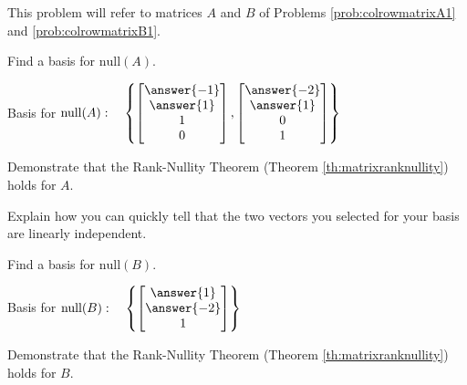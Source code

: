 \documentclass{ximera}
\begin{document}
\begin{problem}
This problem will refer to matrices $A$ and $B$ of Problems \ref{prob:colrowmatrixA1} and \ref{prob:colrowmatrixB1}.

\begin{problem}\label{prob:nullABC1}
Find a basis for $\mbox{null}(A)$.

Basis for $\mbox{null}(A):\quad \left\{ \begin{bmatrix}\answer{-1}\\\answer{1}\\1\\0\end{bmatrix}, \begin{bmatrix}\answer{-2}\\\answer{1}\\0\\1\end{bmatrix}\right\}$

Demonstrate that the Rank-Nullity Theorem (Theorem \ref{th:matrixranknullity}) holds for $A$.

Explain how you can quickly tell that the two vectors you selected for your basis are linearly independent.
\end{problem}

\begin{problem}\label{prob:nullABC2}
Find a basis for $\mbox{null}(B)$.

Basis for $\mbox{null}(B):\quad \left\{ \begin{bmatrix}\answer{1}\\\answer{-2}\\1\end{bmatrix}\right\}$

Demonstrate that the Rank-Nullity Theorem (Theorem \ref{th:matrixranknullity}) holds for $B$.
\end{problem}

\end{problem}
\end{document}
